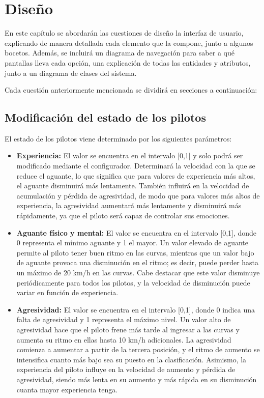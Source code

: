 \chapter{Diseño}

En este capítulo se abordarán las cuestiones de diseño la interfaz de usuario, explicando de manera detallada cada elemento que la compone, junto a algunos bocetos. Además, se incluirá un diagrama de navegación para saber a qué pantallas lleva cada opción, una explicación de todas las entidades y atributos, junto a un diagrama de clases del sistema.

\bigskip

Cada cuestión anteriormente mencionada se dividirá en secciones a continuación:


\section{Modificación del estado de los pilotos}
El estado de los pilotos viene determinado por los siguientes parámetros:

\begin{itemize}
    \item \textbf{Experiencia: }El valor se encuentra en el intervalo [0,1] y solo podrá ser modificado mediante el configurador. Determinará la velocidad con la que se reduce el aguante, lo que significa que para valores de experiencia más altos, el aguante disminuirá más lentamente. También influirá en la velocidad de acumulación y pérdida de agresividad, de modo que para valores más altos de experiencia, la agresividad aumentará más lentamente y disminuirá más rápidamente, ya que el piloto será capaz de controlar sus emociones.
    
    \item \textbf{Aguante físico y mental: }El valor se encuentra en el intervalo [0,1], donde 0 representa el mínimo aguante y 1 el mayor. Un valor elevado de aguante permite al piloto tener buen ritmo en las curvas, mientras que un valor bajo de aguante provoca una disminución en el ritmo; es decir, puede perder hasta un máximo de 20 km/h en las curvas. Cabe destacar que este valor disminuye periódicamente para todos los pilotos, y la velocidad de disminución puede variar en función de experiencia.
    
    \item \textbf{Agresividad: }El valor se encuentra en el intervalo [0,1], donde 0 indica una falta de agresividad y 1 representa el máximo nivel. Un valor alto de agresividad hace que el piloto frene más tarde al ingresar a las curvas y aumenta su ritmo en ellas hasta 10 km/h adicionales. La agresividad comienza a aumentar a partir de la tercera posición, y el ritmo de aumento se intensifica cuanto más bajo sea su puesto en la clasificación. Asimismo, la experiencia del piloto influye en la velocidad de aumento y pérdida de agresividad, siendo más lenta en su aumento y más rápida en su disminución cuanta mayor experiencia tenga.
\end{itemize}

